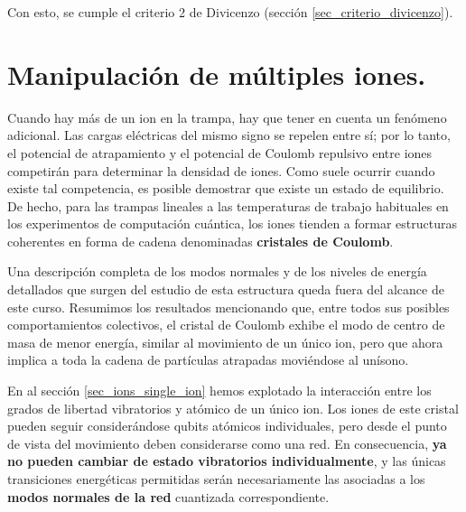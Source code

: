 Con esto, se cumple el criterio 2 de Divicenzo (sección \ref{sec_criterio_divicenzo}).

\section{Manipulación de múltiples iones.}


Cuando hay más de un ion en la trampa, hay que tener en cuenta un fenómeno adicional. Las cargas eléctricas del mismo signo se repelen entre sí; por lo tanto, el potencial de atrapamiento y el potencial de Coulomb repulsivo entre iones competirán para determinar la densidad de iones. Como suele ocurrir cuando existe tal competencia, es posible demostrar que existe un estado de equilibrio. De hecho, para las trampas lineales a las temperaturas de trabajo habituales en los experimentos de computación cuántica, los iones tienden a formar estructuras coherentes en forma de cadena denominadas \textbf{cristales de Coulomb}. 

Una descripción completa de los modos normales y de los niveles de energía detallados que surgen del estudio de esta estructura queda fuera del alcance de este curso. Resumimos los resultados mencionando que, entre todos sus posibles comportamientos colectivos, el cristal de Coulomb exhibe el modo de centro de masa de menor energía, similar al movimiento de un único ion, pero que ahora implica a toda la cadena de partículas atrapadas moviéndose al unísono.

En al sección \ref{sec_ions_single_ion} hemos explotado la interacción entre los grados de libertad vibratorios y atómico de un único ion. Los iones de este cristal pueden seguir considerándose qubits atómicos individuales, pero desde el punto de vista del movimiento deben considerarse como una red. En consecuencia, \textbf{ya no pueden cambiar de estado vibratorios individualmente}, y las únicas transiciones energéticas permitidas serán necesariamente las asociadas a los \textbf{modos normales de la red} cuantizada correspondiente. 

